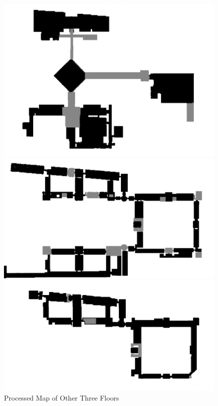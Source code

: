 \documentclass{mcmthesis}
\begin{document}
\begin{figure}[H]
\parbox[b]{.35\textwidth}{\centering
\includegraphics[scale=0.45]{floor-1}
}
\parbox[b]{.3\textwidth}{\centering
\includegraphics[scale=0.4]{floor1}
}
\parbox[b]{.3\textwidth}{\centering
\includegraphics[scale=0.45]{floor2}
}
\caption{ Processed Map of Other Three Floors}
\end{figure}
\end{document}
